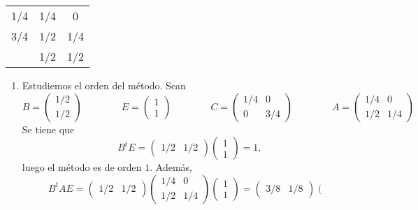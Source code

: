 \documentclass[11pt]{report}
\begin{document}
\begin{center}
    \setlength\extrarowheight{2.5pt}
    \begin{tabular}{c|cc}
        1/4 & 1/4 & 0 \\
        3/4 & 1/2  & 1/4 \\ \hline
        & 1/2 & 1/2
    \end{tabular}
    \end{center}

\begin{enumerate}
    \item Estudiemos el orden del método. Sean
    \[B = \left(\begin{array}{c}
        1/2 \\
        1/2
    \end{array}\right) \qquad \qquad E= \left(\begin{array}{c}
        1 \\
        1
    \end{array}\right) \qquad \qquad C = \left(\begin{array}{cc}
        1/4 & 0 \\
        0 & 3/4
    \end{array}\right) \qquad \qquad A=\left(\begin{array}{cc}
        1/4 & 0 \\
        1/2 & 1/4
    \end{array}\right)\]
    Se tiene que
    \[B^tE = \left(\begin{array}{cc}
        1/2 & 1/2
    \end{array}\right)\left(\begin{array}{c}
        1 \\
        1
    \end{array}\right) =1,\]
    luego el método es de orden $1$. Además,
    \[B^tAE = \left(\begin{array}{cc}
        1/2 & 1/2
    \end{array}\right)\left(\begin{array}{cc}
        1/4 & 0 \\
        1/2 & 1/4
    \end{array}\right)\left(\begin{array}{c}
        1 \\
        1
    \end{array}\right) = \left(\begin{array}{cc}
        3/8 & 1/8
    \end{array}\right)\left(\begin{array}{c}

\end{array}\]
\end{enumerate}
\end{document}
